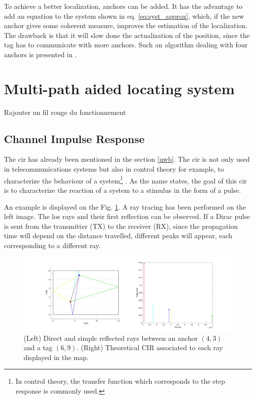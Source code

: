 To achieve a better localization, anchors can be added. It has the advantage to add an equation to the system shown in eq. \ref{eq:syst_approx}, which, if the new anchor gives some coherent measure, improves the estimation of the localization. The drawback is that it will slow done the actualization of the position, since the tag has to communicate with more anchors. Such an algorithm dealing with four anchors is presented in \cite{guyard2019navigation}.

\section{Multi-path aided locating system}
\label{mpls}

\color{red} Rajouter un fil rouge du fonctionnement \color{black}

\subsection{Channel Impulse Response}
\label{mp_cir}

The \gls{cir} has already been mentioned in the section \ref{uwb}. The \gls{cir} is not only used in telecommunications systems but also in control theory for example, to characterize the behaviour of a system\footnote{In control theory, the transfer function which corresponds to the step response is commonly used.} \cite{garonne2019course}. As the name states, the goal of this \gls{cir} is to characterize the reaction of a system to a stimulus in the form of a pulse.
\vspace{2mm}

An example is displayed on the Fig. \ref{fig:cir_ex1}. A ray tracing has been performed on the left image. The \gls{los} rays and their first reflection can be observed. If a Dirac pulse is sent from the transmitter (TX) to the receiver (RX), since the propagation time will depend on the distance travelled, different peaks will appear, each corresponding to a different ray.

\begin{figure}[H]
	\centering
	\includegraphics[width=.95\linewidth]{Images/Anchor-mpc.jpg}
	\caption{(Left) Direct and simple reflected rays between an anchor $(4, 3)$ and a tag $(6, 9)$. (Right) Theoretical CIR associated to each ray displayed in the map. 	\label{fig:cir_ex1}}

\end{figure}

